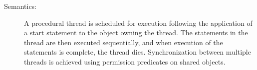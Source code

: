 \documentclass{overturerepchap}
\newcommand{\keyw}[1]{{\bf\ttfamily #1}}
\begin{document}
{\begin{description}
\item[Semantics:] \mbox{}
A procedural thread is scheduled for execution following the
application of a start statement to the object owning the thread. The
statements in the thread are then executed sequentially, and when
execution of the statements is complete, the thread
dies. Synchronization between multiple threads is achieved using
permission predicates on shared objects.
%
%
%
%

\end{description}}
\end{document}
